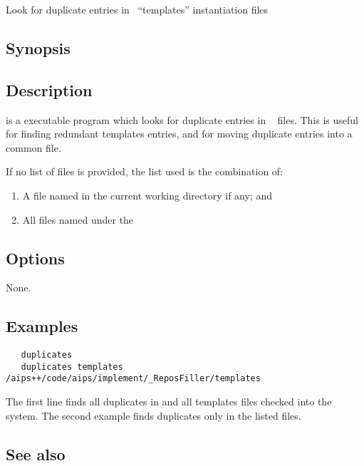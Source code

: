 Look for duplicate entries in \aipspp\ ``templates'' instantiation files

\subsection*{Synopsis}

\begin{synopsis}
\end{synopsis}

\subsection*{Description}

 is a  executable program which looks for duplicate
entries in \aipspp\  files. This is useful for finding
redundant templates entries, and for moving duplicate entries into a common
 file.

If no list of files is provided, the list used is the combination of:
\begin{enumerate}
	\item A file named  in the current working directory
              if any; and
	\item All files named  under the
\end{enumerate}

\subsection*{Options}

None.

\subsection*{Examples}

\begin{verbatim}
   duplicates
   duplicates templates /aips++/code/aips/implement/_ReposFiller/templates
\end{verbatim}

The first line finds all duplicates in  and all templates
files checked into the system. The second example finds duplicates only in
the listed files.

\subsection*{See also}

